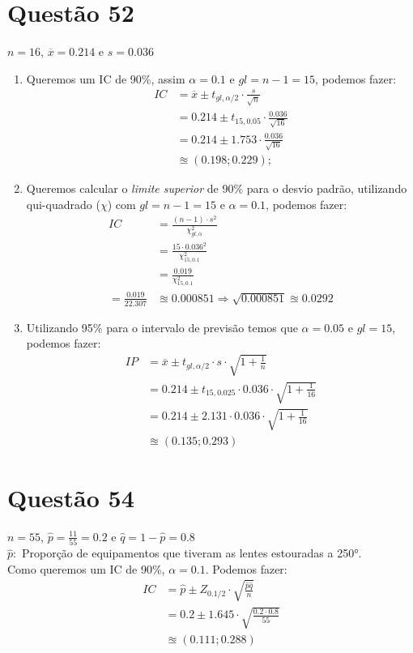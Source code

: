 \documentclass[12pt]{article}
\newcommand{\quest}[1]{\section*{Questão #1}} %
\begin{document}
\quest{52}
$n = 16$, $\overline{x} = 0.214$ e $s = 0.036$
\begin{enumerate}
    \item Queremos um IC de 90\%, assim $\alpha = 0.1$ e $gl = n-1 = 15$, podemos fazer:
    \begin{align*}
        IC &= \overline{x} \pm t_{gl,\alpha/2} \cdot \frac{s}{\sqrt{n}}\\
           &= 0.214 \pm t_{15,0.05} \cdot \frac{0.036}{\sqrt{16}}\\
           &= 0.214 \pm 1.753 \cdot \frac{0.036}{\sqrt{16}}\\
           &\approxeq (0.198;0.229);
    \end{align*}
    \item Queremos calcular o \textit{limite superior} de 90\% para o desvio padrão, utilizando qui-quadrado ($\chi$) com $gl = n-1 = 15$ e $\alpha=0.1$, podemos fazer:
    \begin{align*}
        IC &= \frac{(n-1)\cdot s^2}{\chi^2_{gl,\alpha}}\\
           &= \frac{15\cdot 0.036^2}{\chi^2_{15,0.1}}\\
           &= \frac{0.019}{\chi^2_{15,0.1}}\\
           = \frac{0.019}{22.307} &\approxeq 0.000851 \Rightarrow \sqrt{0.000851} \approxeq 0.0292
    \end{align*}
    \item Utilizando 95\% para o intervalo de previsão temos que $\alpha = 0.05$ e $gl = 15$, podemos fazer:
    \begin{align*}
        IP &= \overline{x} \pm t_{gl,\alpha/2}\cdot s\cdot\sqrt{1+\frac{1}{n}}\\
           &= 0.214 \pm t_{15,0.025} \cdot 0.036 \cdot \sqrt{1+\frac{1}{16}}\\
           &= 0.214 \pm 2.131 \cdot 0.036 \cdot \sqrt{1+\frac{1}{16}}\\
           &\approxeq (0.135;0.293)
    \end{align*}
\end{enumerate}

\quest{54}
$n = 55$, $\hat{p} = \frac{11}{55} = 0.2$ e $\hat{q} = 1-\hat{p} = 0.8$\\
$\hat{p}:$ Proporção de equipamentos que tiveram as lentes estouradas a 250°.\\
Como queremos um IC de 90\%, $\alpha = 0.1$. Podemos fazer:
\begin{align*}
    IC &= \hat{p} \pm Z_{0.1/2} \cdot \sqrt{\frac{\hat{p}\hat{q}}{n}}\\
       &= 0.2 \pm 1.645 \cdot \sqrt{\frac{0.2 \cdot 0.8}{55}}\\
       &\approxeq (0.111;0.288)
\end{align*}
\end{document}
